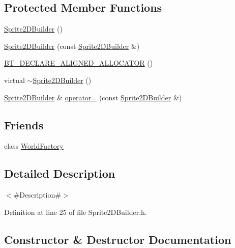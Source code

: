\subsection*{Protected Member Functions}
\begin{DoxyCompactItemize}
\item 
\mbox{\hyperlink{classnjli_1_1_sprite2_d_builder_a2e85b174d6ad697a903b0f4fb3cd1f99}{Sprite2\+D\+Builder}} ()
\item 
\mbox{\hyperlink{classnjli_1_1_sprite2_d_builder_ad2651a7e1fa270afeb471fff17074f4c}{Sprite2\+D\+Builder}} (const \mbox{\hyperlink{classnjli_1_1_sprite2_d_builder}{Sprite2\+D\+Builder}} \&)
\item 
\mbox{\hyperlink{classnjli_1_1_sprite2_d_builder_a3cb3a2562d320aeb02a16b5ca981f9e4}{B\+T\+\_\+\+D\+E\+C\+L\+A\+R\+E\+\_\+\+A\+L\+I\+G\+N\+E\+D\+\_\+\+A\+L\+L\+O\+C\+A\+T\+OR}} ()
\item 
virtual \mbox{\hyperlink{classnjli_1_1_sprite2_d_builder_a81aeb417544a413ce9345f14268c6c80}{$\sim$\+Sprite2\+D\+Builder}} ()
\item 
\mbox{\hyperlink{classnjli_1_1_sprite2_d_builder}{Sprite2\+D\+Builder}} \& \mbox{\hyperlink{classnjli_1_1_sprite2_d_builder_a22eb97bc2d4dc995d5a7c0269da32ac4}{operator=}} (const \mbox{\hyperlink{classnjli_1_1_sprite2_d_builder}{Sprite2\+D\+Builder}} \&)
\end{DoxyCompactItemize}
\subsection*{Friends}
\begin{DoxyCompactItemize}
\item 
class \mbox{\hyperlink{classnjli_1_1_sprite2_d_builder_acb96ebb09abe8f2a37a915a842babfac}{World\+Factory}}
\end{DoxyCompactItemize}


\subsection{Detailed Description}
$<$\#\+Description\#$>$ 

Definition at line 25 of file Sprite2\+D\+Builder.\+h.



\subsection{Constructor \& Destructor Documentation}
\mbox{\label{classnjli_1_1_sprite2_d_builder_a2e85b174d6ad697a903b0f4fb3cd1f99}} 
